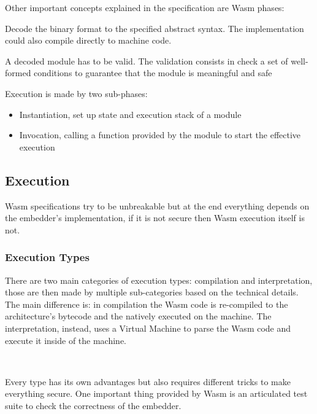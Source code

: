 \documentclass[../main.tex]{subfiles}
\begin{document}
Other important concepts explained in the specification are Wasm phases:

\begin{description}[font=$\bullet$ \scshape\bfseries]
  \item[Decoding]
        Decode the binary format to the specified abstract syntax. The implementation could also compile directly to machine code.
  \item[Validation]
        A decoded module has to be valid. The validation consists in check a set of well-formed conditions to guarantee that the module is meaningful and safe ~\cite{wasm-polkadot-wiki}
  \item[Execution]
        Execution is made by two sub-phases:
        \begin{itemize}
          \item Instantiation, set up state and execution stack of a module
          \item Invocation, calling a function provided by the module to start the effective execution
        \end{itemize}
\end{description}

\subsection{Execution}

Wasm specifications try to be unbreakable but at the end everything depends on the embedder's implementation, if it is not secure then Wasm execution itself is not.

\subsubsection{Execution Types}

There are two main categories of execution types: compilation and interpretation, those are then made by multiple sub-categories based on the technical details. The main difference is: in compilation the Wasm code is re-compiled to the architecture's bytecode and the natively executed on the machine. The interpretation, instead, uses a Virtual Machine to parse the Wasm code and execute it inside of the machine.

\

Every type has its own advantages but also requires different tricks to make everything secure. One important thing provided by Wasm is an articulated test suite to check the correctness of the embedder.~\cite{wasm-testsuite}
\end{document}
